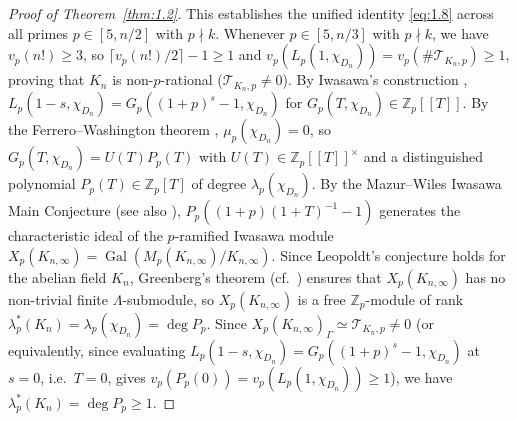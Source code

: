 \documentclass[11pt,reqno]{amsart}
\theoremstyle{remark}
\numberwithin{equation}{section}
\newcommand{\Z}{\mathbb{Z}}
\DeclareMathOperator{\Gal}{Gal}
\begin{document}
\begin{proof}[Proof of Theorem~\ref{thm:1.2}]
This establishes the unified identity \eqref{eq:1.8} across all primes $p \in [5, n/2]$ with $p \nmid k$. Whenever $p \in [5, n/3]$ with $p \nmid k$, we have $v_p(n!) \ge 3$, so $\lceil v_p(n!)/2 \rceil - 1 \ge 1$ and $v_p(L_p(1, \chi_{D_n})) = v_p(\#\mathcal{T}_{K_n, p}) \ge 1$, proving that $K_n$ is non-$p$-rational ($\mathcal{T}_{K_n, p} \ne 0$). By Iwasawa's construction \cite[Theorem~7.10]{Washington1997}, $L_p(1 - s, \chi_{D_n}) = G_p((1 + p)^s - 1, \chi_{D_n})$ for $G_p(T, \chi_{D_n}) \in \Z_p[[T]]$. By the Ferrero--Washington theorem \cite{FerreroWashington1979}, $\mu_p(\chi_{D_n}) = 0$, so $G_p(T, \chi_{D_n}) = U(T)P_p(T)$ with $U(T) \in \Z_p[[T]]^\times$ and a distinguished polynomial $P_p(T) \in \Z_p[T]$ of degree $\lambda_p(\chi_{D_n})$. By the Mazur--Wiles Iwasawa Main Conjecture \cite{MazurWiles1984} (see also \cite{OzakiTaya1998,Taya1996}), $P_p((1+p)(1+T)^{-1}-1)$ generates the characteristic ideal of the $p$-ramified Iwasawa module $X_p(K_{n,\infty}) = \Gal(M_p(K_{n,\infty})/K_{n,\infty})$. Since Leopoldt's conjecture holds for the abelian field $K_n$, Greenberg's theorem \cite[Proposition~3]{Greenberg1978} (cf.\ \cite[Proposition~4.7]{Yanagisawa2026}) ensures that $X_p(K_{n,\infty})$ has no non-trivial finite $\Lambda$-submodule, so $X_p(K_{n,\infty})$ is a free $\Z_p$-module of rank $\lambda_p^*(K_n) = \lambda_p(\chi_{D_n}) = \deg P_p$. Since $X_p(K_{n,\infty})_\Gamma \simeq \mathcal{T}_{K_n, p} \ne 0$ (or equivalently, since evaluating $L_p(1-s, \chi_{D_n}) = G_p((1+p)^s - 1, \chi_{D_n})$ at $s = 0$, i.e.\ $T = 0$, gives $v_p(P_p(0)) = v_p(L_p(1, \chi_{D_n})) \ge 1$), we have $\lambda_p^*(K_n) = \deg P_p \ge 1$.


\end{proof}
\end{document}

